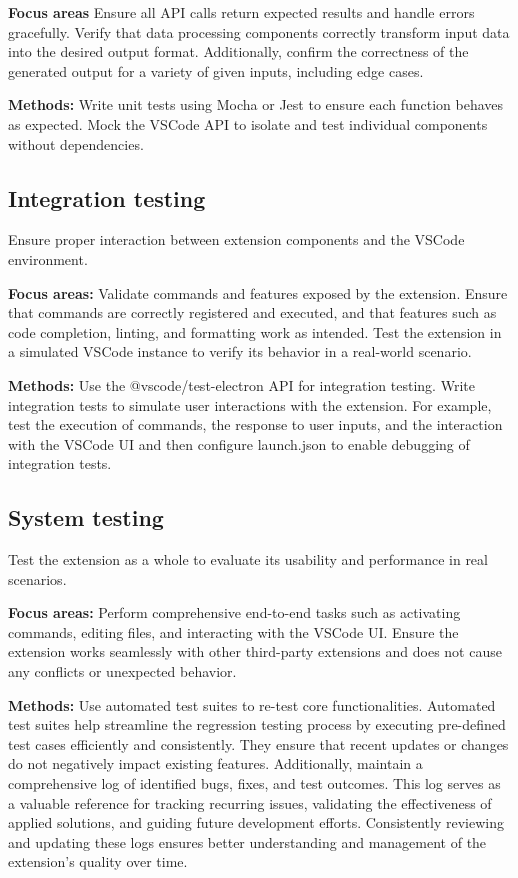 \textbf{Focus areas} Ensure all API calls return expected results and handle errors gracefully. Verify that data processing components correctly transform input data into the desired output format. Additionally, confirm the correctness of the generated output for a variety of given inputs, including edge cases.

\textbf{Methods:} Write unit tests using Mocha or Jest to ensure each function behaves as expected. Mock the VSCode API to isolate and test individual components without dependencies.


\subsection{Integration testing} Ensure proper interaction between extension components and the VSCode environment.

\textbf{Focus areas:} Validate commands and features exposed by the extension. Ensure that commands are correctly registered and executed, and that features such as code completion, linting, and formatting work as intended. Test the extension in a simulated VSCode instance to verify its behavior in a real-world scenario.

\textbf{Methods:} Use the @vscode/test-electron API for integration testing. Write integration tests to simulate user interactions with the extension. For example, test the execution of commands, the response to user inputs, and the interaction with the VSCode UI and then configure launch.json to enable debugging of integration tests.

\subsection{System testing} Test the extension as a whole to evaluate its usability and performance in real scenarios.

\textbf{Focus areas:} Perform comprehensive end-to-end tasks such as activating commands, editing files, and interacting with the VSCode UI. Ensure the extension works seamlessly with other third-party extensions and does not cause any conflicts or unexpected behavior.

\textbf{Methods:} Use automated test suites to re-test core functionalities. Automated test suites help streamline the regression testing process by executing pre-defined test cases efficiently and consistently. They ensure that recent updates or changes do not negatively impact existing features. Additionally, maintain a comprehensive log of identified bugs, fixes, and test outcomes. This log serves as a valuable reference for tracking recurring issues, validating the effectiveness of applied solutions, and guiding future development efforts. Consistently reviewing and updating these logs ensures better understanding and management of the extension’s quality over time.

